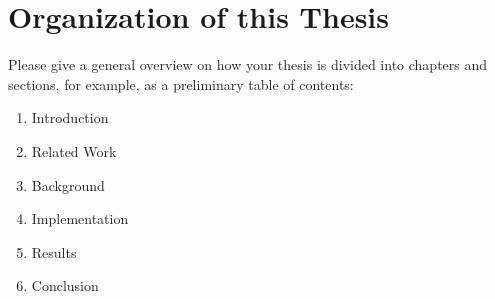 \chapter{Organization of this Thesis}
Please give a general overview on how your thesis is divided into chapters and sections, for example, as a preliminary table of contents:

\begin{enumerate}
    \item Introduction
    \item Related Work
    \item Background
    \item Implementation
    \item Results
    \item Conclusion
\end{enumerate}
